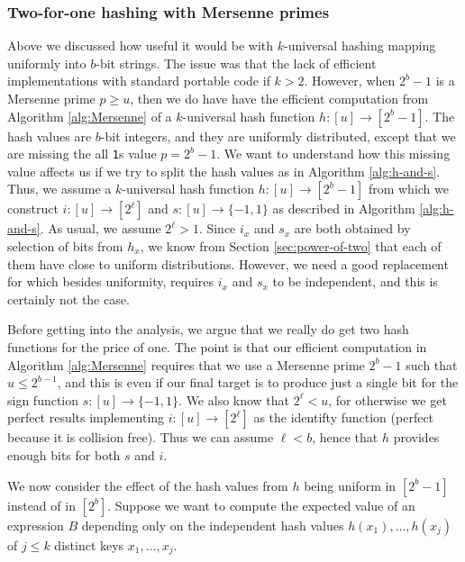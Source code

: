 \subsubsection{Two-for-one hashing with  Mersenne primes}\label{sec:two-for-one}
Above we discussed how useful it would be with $k$-universal hashing
mapping uniformly into $b$-bit strings. The issue was that the lack of
efficient implementations with standard portable code if
$k>2$. However, when $2^b-1$ is a Mersenne prime $p\geq u$, then we do
have have the efficient computation from Algorithm \ref{alg:Mersenne}
of a $k$-universal hash function $h:[u]\to[2^b-1]$. The hash values
are $b$-bit integers, and they are uniformly distributed, except that
we are missing the all \texttt{1}s value $p=2^b-1$. We want to
understand how this missing value affects us if we try to split the
hash values as in Algorithm \ref{alg:h-and-s}. Thus, we assume a
$k$-universal hash function $h:[u]\to[2^b-1]$ from which we construct
$i:[u]\to[2^\ell]$ and $s:[u]\to\{-1,1\}$ as
described in Algorithm \ref{alg:h-and-s}. As usual, we assume $2^\ell>1$.
Since $i_x$ and $s_x$ are
both obtained by selection of bits from $h_x$, we know from Section
\ref{sec:power-of-two} that each of them have close to uniform
distributions. However, we need a good replacement for 
which besides uniformity, requires $i_x$ and $s_x$ to be independent,
and this is certainly not the case.

Before getting into the analysis, we argue that we really do get two
hash functions for the price of one. The point is that our efficient
computation in Algorithm \ref{alg:Mersenne} requires that we use a
Mersenne prime $2^b-1$ such that $u\leq 2^{b-1}$, and this is even if
our final target is to produce just a single bit for the sign function
$s:[u]\to\{-1,1\}$. We also know that $2^\ell<u$, for otherwise we
get perfect results implementing $i:[u]\to[2^\ell]$ as the identifty
function (perfect because it is collision free).  Thus we can assume
$\ell<b$, hence that $h$ provides enough bits for both $s$ and $i$.


We now consider the effect of the hash values from $h$ being uniform
in $[2^b-1]$ instead of in $[2^b]$. Suppose we want to compute the
expected value of an expression $B$ depending only on the independent
hash values $h(x_1),\ldots,h(x_j)$ of $j\leq k$ distinct keys
$x_1,\ldots,x_j$.

